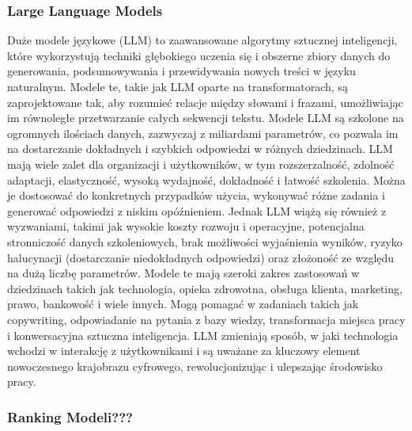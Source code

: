 \subsubsection{Large Language Models}
Duże modele językowe (LLM) to zaawansowane algorytmy sztucznej inteligencji, które wykorzystują techniki głębokiego uczenia się i obszerne zbiory danych do generowania, podsumowywania i przewidywania nowych treści w języku naturalnym. Modele te, takie jak LLM oparte na transformatorach, są zaprojektowane tak, aby rozumieć relacje między słowami i frazami, umożliwiając im równoległe przetwarzanie całych sekwencji tekstu. Modele LLM są szkolone na ogromnych ilościach danych, zazwyczaj z miliardami parametrów, co pozwala im na dostarczanie dokładnych i szybkich odpowiedzi w różnych dziedzinach. LLM mają wiele zalet dla organizacji i użytkowników, w tym rozszerzalność, zdolność adaptacji, elastyczność, wysoką wydajność, dokładność i łatwość szkolenia. Można je dostosować do konkretnych przypadków użycia, wykonywać różne zadania i generować odpowiedzi z niskim opóźnieniem. Jednak LLM wiążą się również z wyzwaniami, takimi jak wysokie koszty rozwoju i operacyjne, potencjalna stronniczość danych szkoleniowych, brak możliwości wyjaśnienia wyników, ryzyko halucynacji (dostarczanie niedokładnych odpowiedzi) oraz złożoność ze względu na dużą liczbę parametrów. Modele te mają szeroki zakres zastosowań w dziedzinach takich jak technologia, opieka zdrowotna, obsługa klienta, marketing, prawo, bankowość i wiele innych. Mogą pomagać w zadaniach takich jak copywriting, odpowiadanie na pytania z bazy wiedzy, transformacja miejsca pracy i konwersacyjna sztuczna inteligencja. LLM zmieniają sposób, w jaki technologia wchodzi w interakcję z użytkownikami i są uważane za kluczowy element nowoczesnego krajobrazu cyfrowego, rewolucjonizując i ulepszając środowisko pracy.

\subsubsection{Ranking Modeli???}


